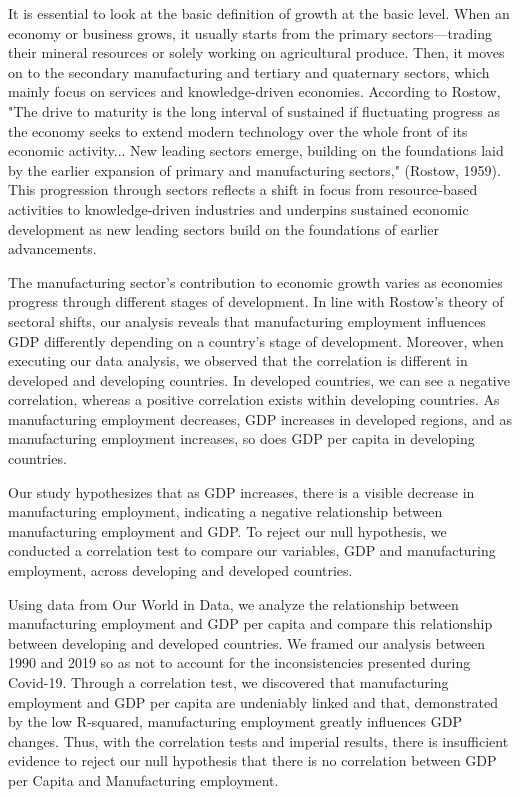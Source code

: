 \documentclass[12pt]{article}
\begin{document}
It is essential to look at the basic definition of growth at the basic level. When an economy or business grows, it usually starts from the primary sectors—trading their mineral resources or solely working on agricultural produce. Then, it moves on to the secondary manufacturing and tertiary and quaternary sectors, which mainly focus on services and knowledge-driven economies. According to Rostow, "The drive to maturity is the long interval of sustained if fluctuating progress as the economy seeks to extend modern technology over the whole front of its economic activity... New leading sectors emerge, building on the foundations laid by the earlier expansion of primary and manufacturing sectors," (Rostow, 1959). This progression through sectors reflects a shift in focus from resource-based activities to knowledge-driven industries and underpins sustained economic development as new leading sectors build on the foundations of earlier advancements.

The manufacturing sector's contribution to economic growth varies as economies progress through different stages of development. In line with Rostow's theory of sectoral shifts, our analysis reveals that manufacturing employment influences GDP differently depending on a country's stage of development. Moreover, when executing our data analysis, we observed that the correlation is different in developed and developing countries. In developed countries, we can see a negative correlation, whereas a positive correlation exists within developing countries. As manufacturing employment decreases, GDP increases in developed regions, and as manufacturing employment increases, so does GDP per capita in developing countries.

Our study hypothesizes that as GDP increases, there is a visible decrease in manufacturing employment, indicating a negative relationship between manufacturing employment and GDP. To reject our null hypothesis, we conducted a correlation test to compare our variables, GDP and manufacturing employment, across developing and developed countries. 


Using data from Our World in Data, we analyze the relationship between manufacturing employment and GDP per capita and compare this relationship between developing and developed countries. We framed our analysis between 1990 and 2019 so as not to account for the inconsistencies presented during Covid-19. Through a correlation test, we discovered that manufacturing employment and GDP per capita are undeniably linked and that, demonstrated by the low R-squared, manufacturing employment greatly influences GDP changes. Thus, with the correlation tests and imperial results, there is insufficient evidence to reject our null hypothesis that there is no correlation between GDP per Capita and Manufacturing employment. 
\end{document}
